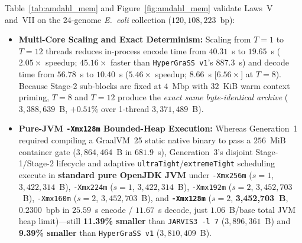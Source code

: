 \documentclass[10pt]{article}
\theoremstyle{definition}
\begin{document}
Table~\ref{tab:amdahl_mem} and Figure~\ref{fig:amdahl_mem} validate Laws~V and~VII on the 24-genome \textit{E.~coli} collection ($120,108,223$~bp):
\begin{itemize}
  \item \textbf{Multi-Core Scaling and Exact Determinism:} Scaling from $T=1$ to $T=12$ threads reduces in-process encode time from $40.31$~s to $19.65$~s ($2.05\times$ speedup; $45.16\times$ faster than \texttt{HyperGraSS v1}'s $887.3$~s) and decode time from $56.78$~s to $10.40$~s ($5.46\times$ speedup; $8.66$~s [$6.56\times$] at $T=8$). Because Stage-2 sub-blocks are fixed at $4$~Mbp with $32$~KiB warm context priming, $T=8$ and $T=12$ produce the \emph{exact same byte-identical archive} ($3,388,639$~B, $+0.51\%$ over 1-thread $3,371,489$~B).
  \item \textbf{Pure-JVM \texttt{-Xmx128m} Bounded-Heap Execution:} Whereas Generation~1 required compiling a GraalVM~25 static native binary to pass a $256$~MiB container gate ($3,864,464$~B in $681.9$~s), Generation~3's disjoint Stage-1/Stage-2 lifecycle and adaptive \texttt{ultraTight}/\texttt{extremeTight} scheduling execute in \textbf{standard pure OpenJDK JVM} under \texttt{-Xmx256m} ($s=1$, $3,422,314$~B), \texttt{-Xmx224m} ($s=1$, $3,422,314$~B), \texttt{-Xmx192m} ($s=2$, $3,452,703$~B), \texttt{-Xmx160m} ($s=2$, $3,452,703$~B), and \textbf{\texttt{-Xmx128m}} ($s=2$, \textbf{3,452,703~B}, $0.2300$~bpb in $25.59$~s encode / $11.67$~s decode, just $1.06$~B/base total JVM heap limit)---still \textbf{11.39\% smaller} than \texttt{JARVIS3 -l 7} ($3,896,361$~B) and \textbf{9.39\% smaller} than \texttt{HyperGraSS v1} ($3,810,409$~B).
\end{itemize}
\end{document}
